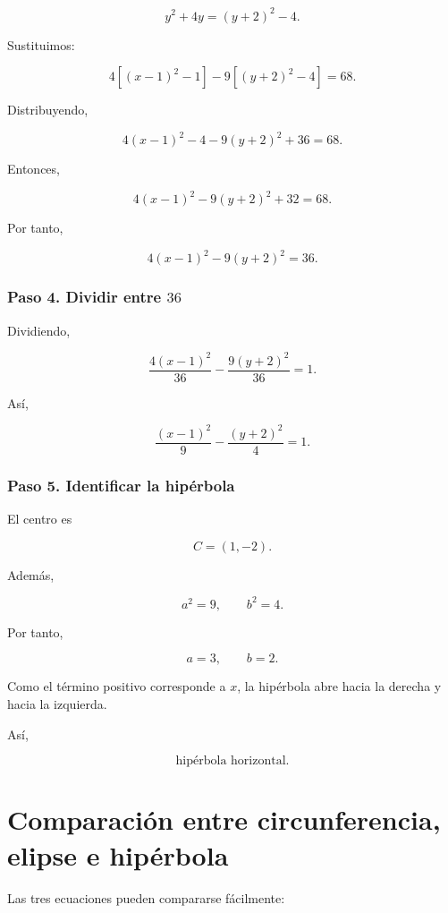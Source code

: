\documentclass[12pt]{article}
\begin{document}
{\[
y^2+4y
=
(y+2)^2-4.
\]

Sustituimos:

\[
4\left[(x-1)^2-1\right]
-
9\left[(y+2)^2-4\right]
=
68.
\]

Distribuyendo,

\[
4(x-1)^2-4
-
9(y+2)^2
+
36
=
68.
\]

Entonces,

\[
4(x-1)^2
-
9(y+2)^2
+
32
=
68.
\]

Por tanto,

\[
4(x-1)^2-9(y+2)^2=36.
\]

\subsubsection*{Paso 4. Dividir entre \(36\)}

Dividiendo,

\[
\frac{4(x-1)^2}{36}
-
\frac{9(y+2)^2}{36}
=
1.
\]

Así,

\[
\boxed{
\frac{(x-1)^2}{9}
-
\frac{(y+2)^2}{4}
=
1.
}
\]

\subsubsection*{Paso 5. Identificar la hipérbola}

El centro es

\[
\boxed{
C=(1,-2).
}
\]

Además,

\[
a^2=9,
\qquad
b^2=4.
\]

Por tanto,

\[
a=3,
\qquad
b=2.
\]

Como el término positivo corresponde a \(x\), la hipérbola abre hacia la
derecha y hacia la izquierda.

Así,

\[
\boxed{
\text{hipérbola horizontal}.
}
\]

\section{Comparación entre circunferencia, elipse e hipérbola}

Las tres ecuaciones pueden compararse fácilmente:

}
\end{document}
